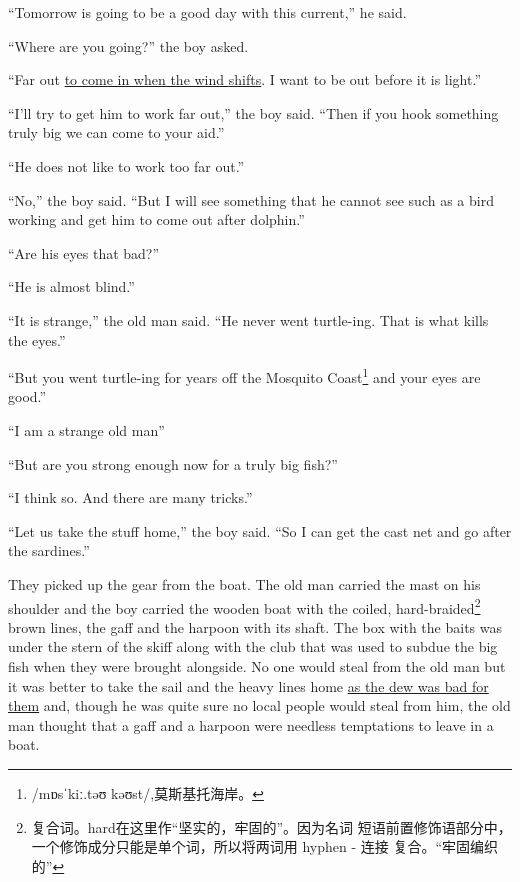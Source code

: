 \documentclass[fontset=ubuntu]{ctexrep}
\newcommand\doulos[1]{{\fontspec{Doulos SIL} /#1/}}
\begin{document}
``Tomorrow is going to be a good day with this current,'' he said.

``Where are you going?'' the boy asked.

``Far out \uline{to come in when the wind \glspl{shift}}. I want to be out before it is light.''

``I'll try to get him to work far out,'' the boy said. ``Then if you \gls{hook} something truly big we can come to your \gls{aid}.''

``He does not like to work too far out.''

``No,'' the boy said. ``But I will see something that he cannot see such as a bird working and get him to come out after \gls{dolphin}.''

``Are his eyes that bad?''

``He is almost blind.''

``It is strange,'' the old man said. ``He never went \gls{turtle}-ing. That is what kills the eyes.''

``But you went turtle-ing for years off the Mosquito
Coast\footnote{\doulos{mɒsˈkiː.təʊ kəʊst},莫斯基托海岸。 } and your eyes
are good.''

``I am a \gls{strange} old man''

``But are you strong enough now for a truly big fish?''

``I think so. And there are many \glspl{trick}.''

``Let us take the \gls{stuff} home,'' the boy said. ``So I can get the \gls{cast} net and go after the sardines.''

They picked up the \gls{gear} from the boat. The old man carried the mast on
his \gls{shoulder} and the boy carried the wooden boat with the coiled,
hard-\gls{braided}\footnote{复合词。hard在这里作“坚实的，牢固的”。因为名词
  短语前置修饰语部分中，一个修饰成分只能是单个词，所以将两词用 hyphen - 连接
  复合。“牢固编织的”} brown lines, the gaff and the harpoon with its
\gls{shaft}. The box with the baits was under the \gls{stern} of the
skiff along with the club that was used to \gls{subdue} the big fish
when they were brought \gls{alongside}. No one would \gls{steal} from the
old man but it was better to take the sail and the heavy lines home \uline{as
the \gls{dew} was bad for them} and, though he was quite sure no local people
would steal from him, the old man thought that a gaff and a harpoon were
\gls{needless} \glspl{temptation} to leave in a boat.
\end{document}

